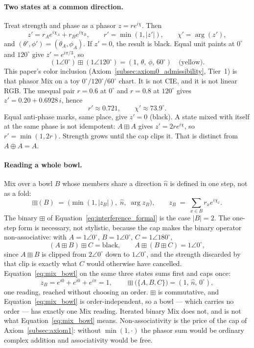 \documentclass[12pt, a4paper]{article}
\begin{document}
\paragraph{Two states at a common direction.}
Treat strength and phase as a phasor $z=r e^{i\chi}$. Then
\begin{equation}
    z' = r_A e^{i\chi_A} + r_B e^{i\chi_B},
    \qquad
    r' = \min(1,|z'|),
    \qquad
    \chi' = \arg(z'),
    \label{eq:interference_formal}
\end{equation}
and $(\theta',\phi')=(\theta_A,\phi_A)$. If $z'=0$, the result is
black. Equal unit paints at $0^\circ$ and $120^\circ$ give
$z'=e^{i\pi/3}$, so
\[
(1\angle 0^\circ)\boxplus(1\angle 120^\circ)
=(1,\,\theta,\,\phi,\,60^\circ)
\quad\text{(yellow)}.
\]
This paper's color inclusion
(Axiom~\ref{subsec:axiom0_admissibility}, Tier~1) is that phasor Mix
on a toy $0^\circ/120^\circ/60^\circ$ chart. It is not CIE, and it is
not linear RGB.
The unequal pair $r=0.6$ at $0^\circ$ and $r=0.8$ at $120^\circ$
gives $z'=0.20+0.6928\,i$, hence
\[
r'\approx 0.721,\qquad \chi'\approx 73.9^\circ.
\]
Equal anti-phase marks, same place, give $z'=0$ (black).
A state mixed with itself at the same phase is not idempotent:
$A\boxplus A$ gives $z'=2r e^{i\chi}$, so $r'=\min(1,2r)$.
Strength grows until the cap clips it. That is distinct from
$A\oplus A=A$.

\paragraph{Reading a whole bowl.}
Mix over a bowl $B$ whose members share a direction $\hat n$ is
defined in one step, not as a fold:
\begin{equation}
    \boxplus(B)
    \;=\;
    \bigl(\min(1,|z_B|),\;\hat n,\;\arg z_B\bigr),
    \qquad
    z_B \;=\; \sum_{x\in B} r_x e^{i\chi_x}.
    \label{eq:mix_bowl}
\end{equation}
The binary $\boxplus$ of Equation~\eqref{eq:interference_formal} is
the case $|B|=2$. The one-step form is necessary, not stylistic,
because the cap makes the binary operator non-associative: with
$A=1\angle 0^\circ$, $B=1\angle 0^\circ$, $C=1\angle 180^\circ$,
\[
(A\boxplus B)\boxplus C=\text{black},
\qquad
A\boxplus(B\boxplus C)=1\angle 0^\circ ,
\]
since $A\boxplus B$ is clipped from $2\angle 0^\circ$ down to
$1\angle 0^\circ$, and the strength discarded by that clip is exactly
what $C$ would otherwise have cancelled.
Equation~\eqref{eq:mix_bowl} on the same three states sums first and
caps once:
\[
z_B = e^{i0}+e^{i0}+e^{i\pi} = 1,
\qquad
\boxplus\bigl(\{A,B,C\}\bigr) = (1,\,\hat n,\,0^\circ),
\]
one reading, reached without choosing an order. $\boxplus$ is
commutative,
and Equation~\eqref{eq:mix_bowl} is order-independent, so a bowl ---
which carries no order --- has exactly one Mix reading. Iterated
binary Mix does not, and is not what
Equation~\eqref{eq:mix_bowl} means. Non-associativity is the price of
the cap of Axiom~\ref{subsec:axiom1}: without $\min(1,\cdot)$ the
phasor sum would be ordinary complex addition and associativity would
be free.
\end{document}
